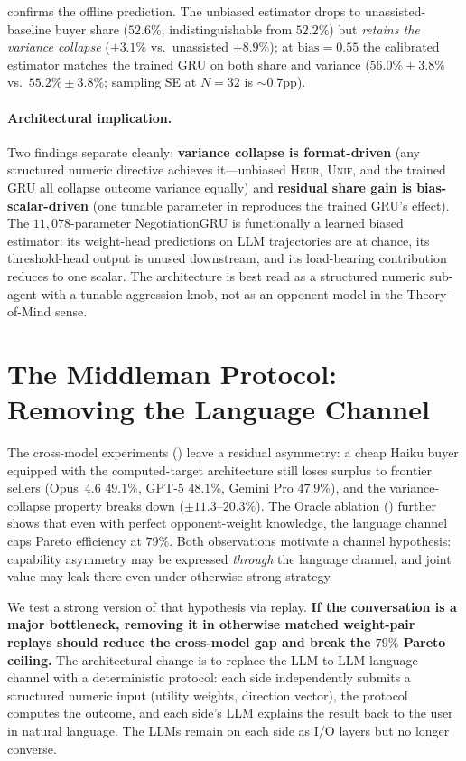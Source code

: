 \documentclass[11pt,a4paper]{article}
\begin{document}
 confirms the offline prediction. The unbiased estimator drops to unassisted-baseline buyer share ($52.6\%$, indistinguishable from $52.2\%$) but \emph{retains the variance collapse} ($\pm 3.1\%$ vs.\ unassisted $\pm 8.9\%$); at $\text{bias} = 0.55$ the calibrated estimator matches the trained GRU on both share and variance ($56.0\% \pm 3.8\%$ vs.\ $55.2\% \pm 3.8\%$; sampling SE at $N\!=\!32$ is $\sim 0.7$pp).

\paragraph{Architectural implication.} Two findings separate cleanly: \textbf{variance collapse is format-driven} (any structured numeric directive achieves it---unbiased \textsc{Heur}, \textsc{Unif}, and the trained GRU all collapse outcome variance equally) and \textbf{residual share gain is bias-scalar-driven} (one tunable parameter in  reproduces the trained GRU's effect). The $11{,}078$-parameter NegotiationGRU is functionally a learned biased estimator: its weight-head predictions on LLM trajectories are at chance, its threshold-head output is unused downstream, and its load-bearing contribution reduces to one scalar. The architecture is best read as a structured numeric sub-agent with a tunable aggression knob, not as an opponent model in the Theory-of-Mind sense.

\section{The Middleman Protocol: Removing the Language Channel}
\label{sec:middleman}

The cross-model experiments () leave a residual asymmetry: a cheap Haiku buyer equipped with the computed-target architecture still loses surplus to frontier sellers (Opus~4.6 $49.1\%$, GPT-5 $48.1\%$, Gemini Pro $47.9\%$), and the variance-collapse property breaks down ($\pm 11.3$--$20.3\%$). The Oracle ablation () further shows that even with perfect opponent-weight knowledge, the language channel caps Pareto efficiency at $79\%$. Both observations motivate a channel hypothesis: capability asymmetry may be expressed \emph{through} the language channel, and joint value may leak there even under otherwise strong strategy.

We test a strong version of that hypothesis via replay. \textbf{If the conversation is a major bottleneck, removing it in otherwise matched weight-pair replays should reduce the cross-model gap and break the $79\%$ Pareto ceiling.} The architectural change is to replace the LLM-to-LLM language channel with a deterministic protocol: each side independently submits a structured numeric input (utility weights, direction vector), the protocol computes the outcome, and each side's LLM explains the result back to the user in natural language. The LLMs remain on each side as I/O layers but no longer converse.
\end{document}
